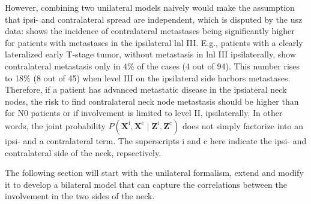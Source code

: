 \documentclass[\relativeRoot/main.tex]{subfiles}
\begin{document}
However, combining two unilateral models naively would make the assumption that ipsi- and contralateral spread are independent, which is disputed by the \gls{usz} data:  shows the incidence of contralateral metastases being significantly higher for patients with metastases in the ipsilateral \gls{lnl} III. E.g., patients with a clearly lateralized early T-stage tumor, without metastasis in \gls{lnl} III ipsilaterally, show contralateral metastasis only in 4\% of the cases (4 out of 94). This number rises to 18\% (8 out of 45) when level III on the ipsilateral side harbors metastases. Therefore, if a patient has advanced metastatic disease in the ipsiateral neck nodes, the risk to find contralateral neck node metastasis should be higher than for N0 patients or if involvement is limited to level II, ipsilaterally. In other words, the joint probability $P \left( \mathbf{X}^\text{i}, \mathbf{X}^\text{c} \mid \mathbf{Z}^\text{i}, \mathbf{Z}^\text{c} \right)$ does not simply factorize into an ipsi- and a contralateral term. The superscripts $\text{i}$ and $\text{c}$ here indicate the ipsi- and contralateral side of the neck, repsectively.

The following section will start with the unilateral formalism, extend and modify it to develop a bilateral model that can capture the correlations between the involvement in the two sides of the neck.




\end{document}
